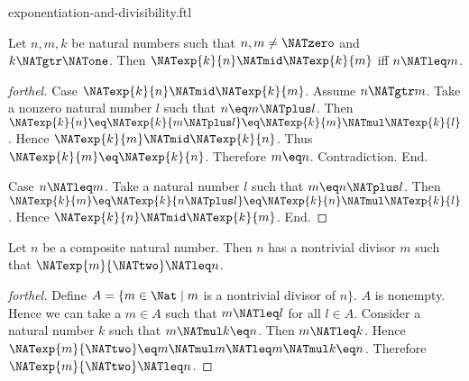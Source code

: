 \documentclass{naproche-library}
\begin{document}
\begin{smodule}[title=Exponentiation and Divisibility]{exponentiation-and-divisibility.ftl}

\begin{proposition}[forthel,id=ARITHMETIC_13_8426075493236736]
  Let $n, m, k$ be natural numbers such that $n, m \neq \NATzero$ and $k \NATgtr \NATone$.
  Then $\NATexp{k}{n} \NATmid \NATexp{k}{m}$ iff $n \NATleq m$.
\end{proposition}
\begin{proof}[forthel]
  Case $\NATexp{k}{n} \NATmid \NATexp{k}{m}$.
    Assume $n \NATgtr m$.
    Take a nonzero natural number $l$ such that $n \eq m \NATplus l$.
    Then $\NATexp{k}{n}
      \eq \NATexp{k}{m \NATplus l}
      \eq \NATexp{k}{m} \NATmul \NATexp{k}{l}$.
    Hence $\NATexp{k}{m} \NATmid \NATexp{k}{n}$.
    Thus $\NATexp{k}{m} \eq \NATexp{k}{n}$.
    Therefore $m \eq n$.
    Contradiction.
  End.

  Case $n \NATleq m$.
    Take a natural number $l$ such that $m \eq n \NATplus l$.
    Then $\NATexp{k}{m}
      \eq \NATexp{k}{n \NATplus l}
      \eq \NATexp{k}{n} \NATmul \NATexp{k}{l}$.
    Hence $\NATexp{k}{n} \NATmid \NATexp{k}{m}$.
  End.
\end{proof}

\begin{proposition}[forthel,id=ARITHMETIC_13_797196163219456]
  Let $n$ be a composite natural number.
  Then $n$ has a nontrivial divisor $m$ such that $\NATexp{m}{\NATtwo} \NATleq n$.
\end{proposition}
\begin{proof}[forthel]
  Define $A = \{ m \in \Nat \mid m$ is a nontrivial divisor of $n \}$.
  $A$ is nonempty.
  Hence we can take a $m \in A$ such that $m \NATleq l$ for all $l \in A$.
  Consider a natural number $k$ such that $m \NATmul k \eq n$.
  Then $m \NATleq k$.
  Hence $\NATexp{m}{\NATtwo} \eq m \NATmul m \NATleq m \NATmul k \eq n$.
  Therefore $\NATexp{m}{\NATtwo} \NATleq n$.
\end{proof}
\end{smodule}
\end{document}
